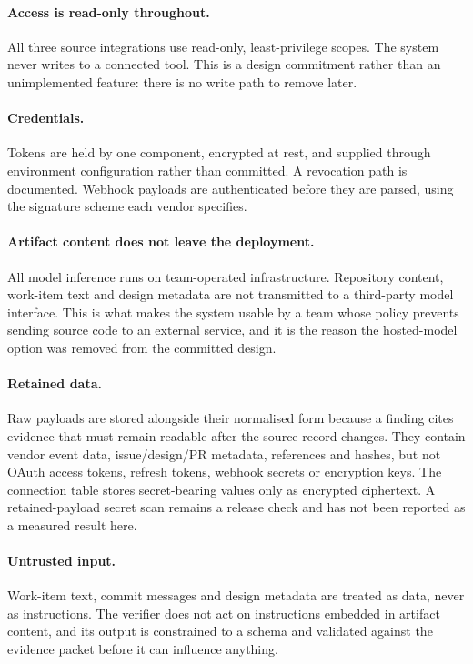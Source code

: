 \paragraph{Access is read-only throughout.} All three source integrations use
read-only, least-privilege scopes. The system never writes to a connected tool.
This is a design commitment rather than an unimplemented feature: there is no
write path to remove later.

\paragraph{Credentials.} Tokens are held by one component, encrypted at rest,
and supplied through environment configuration rather than committed. A
revocation path is documented. Webhook payloads are authenticated before they
are parsed, using the signature scheme each vendor specifies.

\paragraph{Artifact content does not leave the deployment.} All model inference
runs on team-operated infrastructure. Repository content, work-item text and
design metadata are not transmitted to a third-party model interface. This is
what makes the system usable by a team whose policy prevents sending source
code to an external service, and it is the reason the hosted-model option was
removed from the committed design.

\paragraph{Retained data.} Raw payloads are stored alongside their normalised
form because a finding cites evidence that must remain readable after the
source record changes. They contain vendor event data, issue/design/PR
metadata, references and hashes, but not OAuth access tokens, refresh tokens,
webhook secrets or encryption keys. The connection table stores secret-bearing
values only as encrypted ciphertext. A retained-payload secret scan remains a
release check and has not been reported as a measured result here.

\paragraph{Untrusted input.} Work-item text, commit messages and design
metadata are treated as data, never as instructions. The verifier does not act
on instructions embedded in artifact content, and its output is constrained to
a schema and validated against the evidence packet before it can influence
anything.

